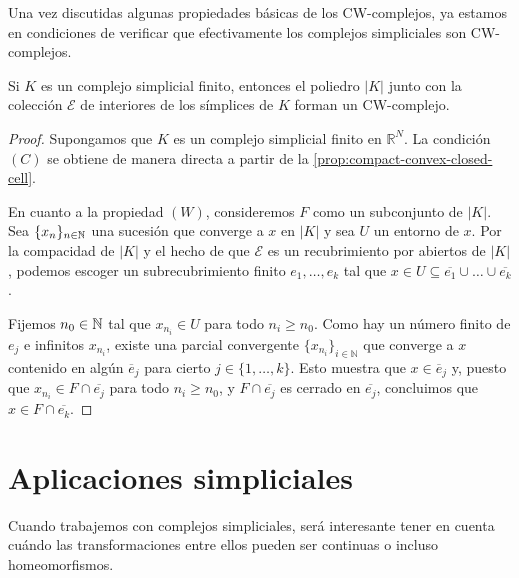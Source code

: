 Una vez discutidas algunas propiedades básicas de los CW-complejos, ya estamos
en condiciones de verificar que efectivamente los complejos simpliciales son CW-complejos.

\begin{proposicion}
	Si $K$ es un complejo simplicial finito, entonces el poliedro $|K|$ junto con
	la colección $\mathcal{E}$ de interiores de los símplices de $K$ forman un CW-complejo.
\end{proposicion}
\begin{proof}
	Supongamos que $K$ es un complejo simplicial finito en $\mathbb{R}^{N}$. La
	condición $(C)$ se obtiene de manera directa a partir de la
	\autoref{prop:compact-convex-closed-cell}.
	
	En cuanto a la propiedad $(W)$, consideremos $F$ como un subconjunto de $|K|$.
	Sea $\{x_{n}\}_{n \in \mathbb{N}}$ una sucesión que converge a $x$ en $|K|$ y sea $U$
	un entorno de $x$. Por la compacidad de $|K|$ y el hecho de que $\mathcal{E}$ es
	un recubrimiento por abiertos de $|K|$, podemos escoger un subrecubrimiento
	finito $e_{1}, \ldots, e_{k}$ tal que
	$x \in U \subseteq \overline{e_1}\cup \ldots \cup \overline{e_k}$.
	
	Fijemos $n_{0} \in \mathbb{N}$ tal que $x_{n_i}\in U$ para todo $n_{i} \geq n_{0}$. Como
	hay un número finito de $e_{j}$ e infinitos $x_{n_i}$, existe una parcial
	convergente $\{x_{n_i}\}_{i \in \mathbb{N}}$ que converge a $x$ contenido en
	algún $\overline{e}_{j}$ para cierto $j \in \{1, \ldots, k\}$. Esto muestra que
	$x \in \overline{e}_{j}$ y, puesto que $x_{n_i}\in F \cap \overline{e_j}$ para
	todo $n_{i} \geq n_{0}$, y $F \cap \overline{e_j}$ es cerrado en $\overline{e_j}$,
	concluimos que $x \in F \cap \overline{e_k}$.
\end{proof}

\section{Aplicaciones simpliciales}

Cuando trabajemos con complejos simpliciales, será interesante tener en cuenta cuándo
las transformaciones entre ellos pueden ser continuas o incluso homeomorfismos.

